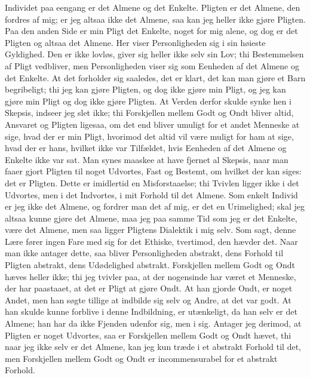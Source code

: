 \documentclass[12pt,a4paper]{article}
\begin{document}
Individet paa eengang er det Almene og det Enkelte. Pligten er det Almene, den fordres af mig; er jeg altsaa ikke det Almene, saa kan jeg heller ikke gjøre Pligten. Paa den anden Side er min Pligt det Enkelte, noget for mig alene, og dog er det Pligten og altsaa det Almene. Her viser Personligheden sig i sin høieste Gyldighed. Den er ikke lovløs, giver sig heller ikke selv sin Lov; thi Bestemmelsen af Pligt vedbliver, men Personligheden viser sig som Eenheden af det Almene og det Enkelte. At det forholder sig saaledes, det er klart, det kan man gjøre et Barn begribeligt; thi jeg kan gjøre Pligten, og dog ikke gjøre min Pligt, og jeg kan gjøre min Pligt og dog ikke gjøre Pligten. At Verden derfor skulde synke hen i Skepsis, indseer jeg slet ikke; thi Forskjellen mellem Godt og Ondt bliver altid, Ansvaret og Pligten ligesaa, om det end bliver umuligt for et andet Menneske at sige, hvad der er min Pligt, hvorimod det altid vil være muligt for ham at sige, hvad der er hans, hvilket ikke var Tilfældet, hvis Eenheden af det Almene og Enkelte ikke var sat. Man synes maaskee at have fjernet al Skepsis, naar man faaer gjort Pligten til noget Udvortes, Fast og Bestemt, om hvilket der kan siges: det er Pligten. Dette er imidlertid en Misforstaaelse; thi Tvivlen ligger ikke i det Udvortes, men i det Indvortes, i mit Forhold til det Almene. Som enkelt Individ er jeg ikke det Almene, og fordrer man det af mig, er det en Urimelighed; skal jeg altsaa kunne gjøre det Almene, maa jeg paa samme Tid som jeg er det Enkelte, være det Almene, men saa ligger Pligtens Dialektik i mig selv. Som sagt, denne Lære fører ingen Fare med sig for det Ethiske, tvertimod, den hævder det. Naar man ikke antager dette, saa bliver Personligheden abstrakt, dens Forhold til Pligten abstrakt, dens Udødelighed abstrakt. Forskjellen mellem Godt og Ondt hæves heller ikke; thi jeg tvivler paa, at der nogensinde har været et Menneske, der har paastaaet, at det er Pligt at gjøre Ondt. At han gjorde Ondt, er noget Andet, men han søgte tillige at indbilde sig selv og Andre, at det var godt. At han skulde kunne forblive i denne Indbildning, er utænkeligt, da han selv er det Almene; han har da ikke Fjenden udenfor sig, men i sig. Antager jeg derimod, at Pligten er noget Udvortes, saa er Forskjellen mellem Godt og Ondt hævet, thi naar jeg ikke selv er det Almene, kan jeg kun træde i et abstrakt Forhold til det, men Forskjellen mellem Godt og Ondt er incommensurabel for et abstrakt Forhold.
\end{document}
